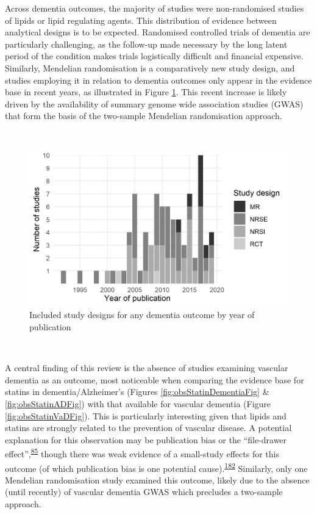 \documentclass[a4paper, twoside]{templates/ociamthesis}
\begin{document}
Across dementia outcomes, the majority of studies were non-randomised studies of lipids or lipid regulating agents. This distribution of evidence between analytical designs is to be expected. Randomised controlled trials of dementia are particularly challenging, as the follow-up made necessary by the long latent period of the condition makes trials logistically difficult and financial expensive. Similarly, Mendelian randomisation is a comparatively new study design, and studies employing it in relation to dementia outcomes only appear in the evidence base in recent years, as illustrated in Figure \ref{fig:typeByYear}. This recent increase is likely driven by the availability of summary genome wide association studies (GWAS) that form the basis of the two-sample Mendelian randomisation approach.

~





\begin{figure}[H]
\includegraphics[width=1\linewidth]{figures/sys-rev/type_by_year} \caption[Study designs by year of publication]{Included study designs for any dementia outcome by year of publication}\label{fig:typeByYear}
\end{figure}

~

A central finding of this review is the absence of studies examining vascular dementia as an outcome, most noticeable when comparing the evidence base for statins in dementia/Alzheimer's (Figures \ref{fig:obsStatinDementiaFig} \& \ref{fig:obsStatinADFig}) with that available for vascular dementia (Figure \ref{fig:obsStatinVaDFig}). This is particularly interesting given that lipids and statins are strongly related to the prevention of vascular disease. A potential explanation for this observation may be publication bias or the ``file-drawer effect'',\textsuperscript{\protect\hyperlink{ref-rosenthal1979}{85}} though there was weak evidence of a small-study effects for this outcome (of which publication bias is one potential cause).\textsuperscript{\protect\hyperlink{ref-sterne2011}{182}} Similarly, only one Mendelian randomisation study examined this outcome, likely due to the absence (until recently) of vascular dementia GWAS which precludes a two-sample approach.
\end{document}

